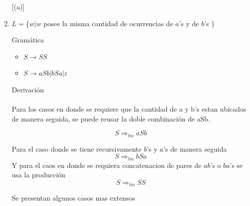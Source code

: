 \documentclass{article}
\begin{document}
	\begin{enumerate} [(a)]
	    \item $L = \{w | w$ posee la misma cantidad de ocurrencias de $a$'s y de $b$'s $\}$
	    
	    Gramática
	    \begin{itemize}
    	    \item $S \rightarrow SS$
    	    \item $S \rightarrow aSb | bSa | \varepsilon$
	    \end{itemize}
        
        Derivación \\ \\
        
        Para los casos en donde se requiere que la cantidad de a y b's estan ubicados de manera seguida, se puede reusar la doble combinación de aSb.
        
        \[ 
            S \Rightarrow_{lm} aSb
        \]
        
        Para el caso donde se tiene recursivamente $b$'s y $a$'s de manera seguida
        \[ 
            S \Rightarrow_{lm} bSa
        \]
        Y para el caos en donde se requiera concatenacion de pares de $ab$'s o $ba$'s se usa la producción
        \[ 
            S \Rightarrow_{lm} SS
        \]
        
        Se presentan algunos casos mas extensos
        

\end{enumerate}
\end{document}
